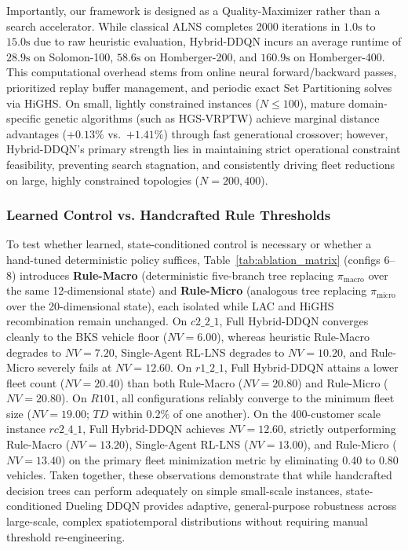 Importantly, our framework is designed as a Quality-Maximizer rather than a search accelerator. While classical ALNS completes 2000 iterations in $1.0\text{s}$ to $15.0\text{s}$ due to raw heuristic evaluation, Hybrid-DDQN incurs an average runtime of $28.9\text{s}$ on Solomon-100, $58.6\text{s}$ on Homberger-200, and $160.9\text{s}$ on Homberger-400. This computational overhead stems from online neural forward/backward passes, prioritized replay buffer management, and periodic exact Set Partitioning solves via HiGHS. On small, lightly constrained instances ($N \le 100$), mature domain-specific genetic algorithms (such as HGS-VRPTW) achieve marginal distance advantages ($+0.13\%$ vs.\ $+1.41\%$) through fast generational crossover; however, Hybrid-DDQN's primary strength lies in maintaining strict operational constraint feasibility, preventing search stagnation, and consistently driving fleet reductions on large, highly constrained topologies ($N=200, 400$).

\subsubsection{Learned Control vs. Handcrafted Rule Thresholds}
\label{sec:disc_rule_vs_learned}
To test whether learned, state-conditioned control is necessary or whether a hand-tuned deterministic policy suffices, Table~\ref{tab:ablation_matrix} (configs 6--8) introduces \textbf{Rule-Macro} (deterministic five-branch tree replacing $\pi_{\text{macro}}$ over the same 12-dimensional state) and \textbf{Rule-Micro} (analogous tree replacing $\pi_{\text{micro}}$ over the 20-dimensional state), each isolated while LAC and HiGHS recombination remain unchanged. On $c2\_2\_1$, Full Hybrid-DDQN converges cleanly to the BKS vehicle floor ($NV=6.00$), whereas heuristic Rule-Macro degrades to $NV=7.20$, Single-Agent RL-LNS degrades to $NV=10.20$, and Rule-Micro severely fails at $NV=12.60$. On $r1\_2\_1$, Full Hybrid-DDQN attains a lower fleet count ($NV=20.40$) than both Rule-Macro ($NV=20.80$) and Rule-Micro ($NV=20.80$). On $R101$, all configurations reliably converge to the minimum fleet size ($NV=19.00$; $TD$ within $0.2\%$ of one another). On the 400-customer scale instance $rc2\_4\_1$, Full Hybrid-DDQN achieves $NV=12.60$, strictly outperforming Rule-Macro ($NV=13.20$), Single-Agent RL-LNS ($NV=13.00$), and Rule-Micro ($NV=13.40$) on the primary fleet minimization metric by eliminating 0.40 to 0.80 vehicles. Taken together, these observations demonstrate that while handcrafted decision trees can perform adequately on simple small-scale instances, state-conditioned Dueling DDQN provides adaptive, general-purpose robustness across large-scale, complex spatiotemporal distributions without requiring manual threshold re-engineering.

